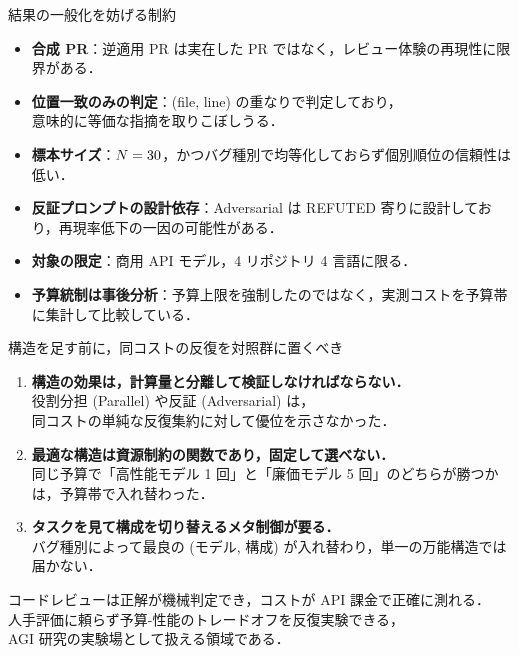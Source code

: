 \documentclass[10pt, aspectratio=169, t]{beamer}
\begin{document}
\begin{frame}{結果の一般化を妨げる制約}
    \begin{itemize}
        \item \textbf{合成 PR}：逆適用 PR は実在した PR ではなく，レビュー体験の再現性に限界がある．
        \item \textbf{位置一致のみの判定}：(file, line) の重なりで判定しており，\\意味的に等価な指摘を取りこぼしうる．
        \item \textbf{標本サイズ}：$N = 30{}$，かつバグ種別で均等化しておらず個別順位の信頼性は低い．
        \item \textbf{反証プロンプトの設計依存}：Adversarial は REFUTED 寄りに設計しており，再現率低下の一因の可能性がある．
        \item \textbf{対象の限定}：商用 API \nModels{} モデル，4 リポジトリ 4 言語に限る．
        \item \textbf{予算統制は事後分析}：予算上限を強制したのではなく，実測コストを予算帯に集計して比較している．
    \end{itemize}
\end{frame}

\begin{frame}{構造を足す前に，同コストの反復を対照群に置くべき}
    \begin{enumerate}
        \item \textbf{構造の効果は，計算量と分離して検証しなければならない．}\\
            役割分担 (Parallel) や反証 (Adversarial) は，\\\alert{同コストの単純な反復集約に対して優位を示さなかった}．
        \item \textbf{最適な構造は資源制約の関数であり，固定して選べない．}\\
            同じ予算で「高性能モデル 1 回」と「廉価モデル 5 回」のどちらが勝つかは，\alert{予算帯で入れ替わった}．
        \item \textbf{タスクを見て構成を切り替えるメタ制御が要る．}\\
            バグ種別によって最良の (モデル, 構成) が入れ替わり，単一の万能構造では届かない．
    \end{enumerate}

    \vspace{6pt}
    コードレビューは正解が機械判定でき，コストが API 課金で正確に測れる．\\
    人手評価に頼らず予算-性能のトレードオフを反復実験できる，\\AGI 研究の実験場として扱える領域である．
\end{frame}
\end{document}
